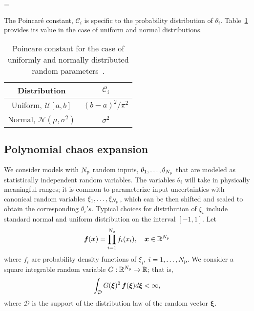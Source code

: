 \be
{} = 
\label{eq:cmu}
\ee

\noindent The Poincar\'e constant, $\mathcal{C}_i$ is specific to the probability distribution of $\theta_i$.
Table~\ref{tab:poincare} provides its value in the case of uniform and normal
distributions.
\bigskip

\begin{table}[htbp]
\renewcommand*{\arraystretch}{1.2}
\begin{center}
\begin{tabular}{|c|c|}
\hline
Distribution & $\mathcal{C}_i$ \\ \hline \hline 
Uniform, $\mathcal{U}[a, b]$ & $(b-a)^{2}/\pi^2$ \\ 
Normal, $\mathcal{N}(\mu,\sigma^2)$ & $\sigma^2$ \\ 
\hline
\end{tabular}
\end{center}

\caption{Poincare constant for the case of uniformly and normally distributed random
parameters~\cite{Roustant:2014}.}
\label{tab:poincare}
\end{table}

\subsection{Polynomial chaos expansion}

We consider models with ${N_\text{p}}$ random inputs, 
$\theta_1, \ldots, \theta_{N_\text{p}}$ that are modeled
as statistically independent random variables. The 
variables $\theta_i$ will take in physically meaningful
ranges; it is common to parameterize input uncertainties
with canonical random variables $\xi_1, \ldots, \xi_{N_\text{p}}$,
which can be then shifted and scaled to obtain the corresponding $\theta_i's$.
Typical choices for distribution of $\xi_i$ include standard normal 
and uniform distribution on the interval $[-1, 1]$.
Let 
\[
   \bm{f}(\bm{x}) = \prod_{i=1}^{N_\text{p}} f_i(x_i), \quad \bm{x} \in \mathbb{R}^{N_\text{p}}
\]
where $f_i$ are probability density functions of $\xi_i$, $i = 1, \ldots, {N_\text{p}}$.
We consider a square integrable random variable $G:\mathbb{R}^{N_\text{p}} \to \mathbb{R}$; 
that is,
\[
\int_{\mathcal{D}} G(\bm{\xi})^2 \, \bm{f}(\bm{\xi})d\bm{\xi} < \infty,
\]
where $\mathcal{D}$ is the support of the distribution law of the random vector
$\bm{\xi}$. 




